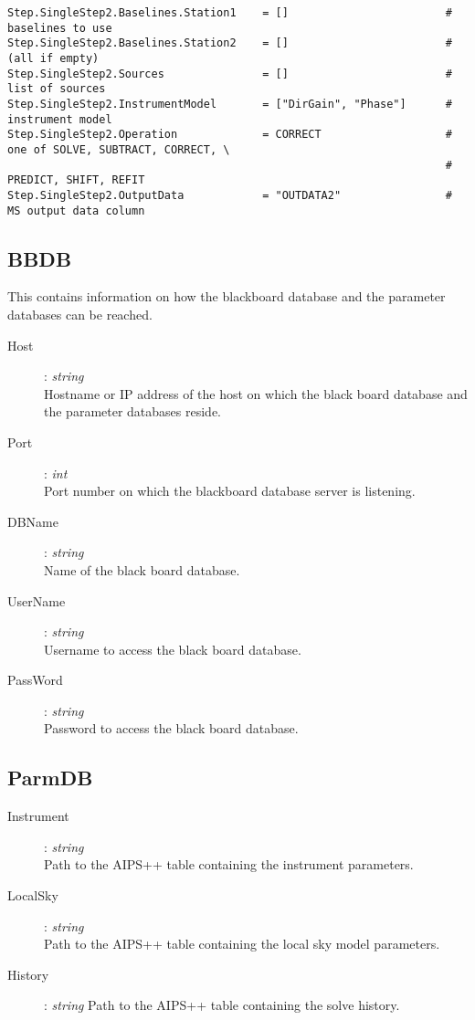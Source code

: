\documentclass[10pt]{lofar}
\begin{document}
{\begin{verbatim}
Step.SingleStep2.Baselines.Station1    = []                        # baselines to use
Step.SingleStep2.Baselines.Station2    = []                        # (all if empty)
Step.SingleStep2.Sources               = []                        # list of sources
Step.SingleStep2.InstrumentModel       = ["DirGain", "Phase"]      # instrument model
Step.SingleStep2.Operation             = CORRECT                   # one of SOLVE, SUBTRACT, CORRECT, \
                                                                   # PREDICT, SHIFT, REFIT
Step.SingleStep2.OutputData            = "OUTDATA2"                # MS output data column
\end{verbatim}
}

\subsection*{BBDB}
\label{app-bbdb}
This contains information on how the blackboard database and the parameter databases can be reached.
\begin{description}
\item [Host] : \emph{string} \\
    Hostname or IP address of the host on which the black board database and the parameter databases reside. 
\item [Port] : \emph{int} \\
    Port number on which the blackboard database server is listening. 
\item [DBName] : \emph{string} \\
    Name of the black board database. 
\item [UserName] : \emph{string} \\
    Username to access the black board database. 
\item [PassWord] : \emph{string} \\
    Password to access the black board database. 
\end{description}

\subsection*{ParmDB}
\label{app-parmdb}
\begin{description}
\item [Instrument] : \emph{string} \\
    Path to the AIPS++ table containing the instrument parameters. 
\item [LocalSky] : \emph{string} \\
    Path to the AIPS++ table containing the local sky model parameters. 
\item [History] : \emph{string}
    Path to the AIPS++ table containing the solve history. 
\end{description}
\end{document}
